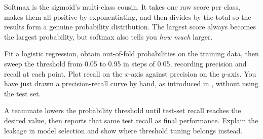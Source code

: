 \begin{mlfigure}
\end{mlfigure}

\begin{keyidea}
Softmax is the sigmoid's multi-class cousin. It takes one raw score per class, makes them all positive by exponentiating, and then divides by the total so the results form a genuine probability distribution. The largest score always becomes the largest probability, but softmax also tells you \emph{how much} larger.
\end{keyidea}

\begin{tryit}
Fit a logistic regression, obtain out-of-fold probabilities on the training data, then sweep the threshold from 0.05 to 0.95 in steps of 0.05, recording precision and recall at each point. Plot recall on the $x$-axis against precision on the $y$-axis. You have just drawn a precision-recall curve by hand, as introduced in , without using the test set.
\end{tryit}

\begin{debugtask}
A teammate lowers the probability threshold until test-set recall reaches the desired value, then reports that same test recall as final performance. Explain the leakage in model selection and show where threshold tuning belongs instead.
\end{debugtask}

